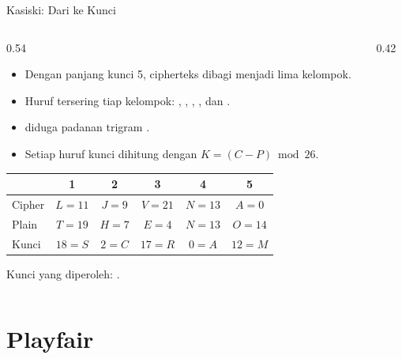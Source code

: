 \documentclass[aspectratio=169,11pt]{beamer}
\begin{document}
\begin{frame}{Kasiski: Dari  ke Kunci }
    \begin{columns}[T,onlytextwidth]
        \begin{column}{0.54\textwidth}
            \footnotesize
            \begin{itemize}
                \item Dengan panjang kunci 5, cipherteks dibagi menjadi lima
                      kelompok.
                \item Huruf tersering tiap kelompok: , ,
                      , , dan .
                \item {} diduga padanan trigram .
                \item Setiap huruf kunci dihitung dengan
                      $K=(C-P)\bmod 26$.
            \end{itemize}
            \begin{center}
            \scriptsize
            \begin{tabular}{@{}lccccc@{}}
                \toprule
                 & 1 & 2 & 3 & 4 & 5 \\
                \midrule
                Cipher & $L=11$ & $J=9$ & $V=21$ & $N=13$ & $A=0$ \\
                Plain  & $T=19$ & $H=7$ & $E=4$ & $N=13$ & $O=14$ \\
                Kunci  & $18=S$ & $2=C$ & $17=R$ & $0=A$ & $12=M$ \\
                \bottomrule
            \end{tabular}
            \end{center}
            {\footnotesize Kunci yang diperoleh: .}
        \end{column}
        \begin{column}{0.42\textwidth}
            \centering
        \end{column}
    \end{columns}
\end{frame}

\section{Playfair}
\end{document}

